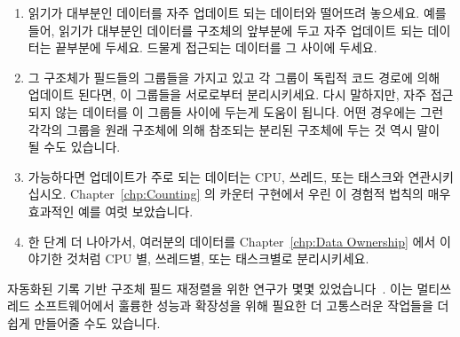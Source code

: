 \fi

\begin{enumerate}
\item	읽기가 대부분인 데이터를 자주 업데이트 되는 데이터와 떨어뜨려 놓으세요.
	예를 들어, 읽기가 대부분인 데이터를 구조체의 앞부분에 두고 자주
	업데이트 되는 데이터는 끝부분에 두세요.
	드물게 접근되는 데이터를 그 사이에 두세요.
\item	그 구조체가 필드들의 그룹들을 가지고 있고 각 그룹이 독립적 코드 경로에
	의해 업데이트 된다면, 이 그룹들을 서로로부터 분리시키세요.
	다시 말하지만, 자주 접근되지 않는 데이터를 이 그룹들 사이에 두는게
	도움이 됩니다.
	어떤 경우에는 그런 각각의 그룹을 원래 구조체에 의해 참조되는 분리된
	구조체에 두는 것 역시 말이 될 수도 있습니다.
\item	가능하다면 업데이트가 주로 되는 데이터는 CPU, 쓰레드, 또는 태스크와
	연관시키십시오.
	Chapter~\ref{chp:Counting} 의 카운터 구현에서 우린 이 경험적 법칙의
	매우 효과적인 예를 여럿 보았습니다.
\item	한 단계 더 나아가서, 여러분의 데이터를
	Chapter~\ref{chp:Data Ownership} 에서 이야기한 것처럼 CPU 별, 쓰레드별,
	또는 태스크별로 분리시키세요.

\end{enumerate}

자동화된 기록 기반 구조체 필드 재정렬을 위한 연구가 몇몇
있었습니다~\cite{Golovanevsky:2010:TDL:2174824.2174835}.
이는 멀티쓰레드 소프트웨어에서 훌륭한 성능과 확장성을 위해 필요한 더 고통스러운
작업들을 더 쉽게 만들어줄 수도 있습니다.


